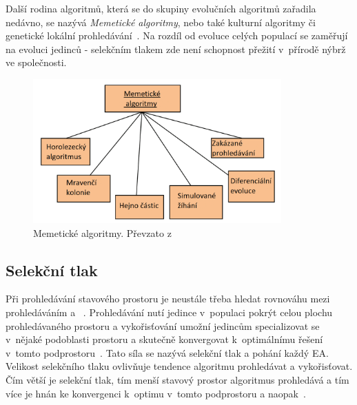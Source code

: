 Další rodina algoritmů, která se do skupiny evolučních algoritmů zařadila nedávno, se nazývá \textit{Memetické algoritmy}, nebo také kulturní algoritmy či genetické lokální prohledávání~\cite{EA_OVERVIEW}. Na rozdíl od evoluce celých populací se zaměřují na evoluci jedinců - selekčním tlakem zde není schopnost přežití v~přírodě nýbrž ve společnosti.

\begin{figure}[hbt]
	\centering
	\includegraphics[width=0.85\textwidth]{obrazky-figures/memetic.png}
	\caption{Memetické algoritmy. Převzato z~\cite{EA_OVERVIEW}}
	\label{fg:memtic}
\end{figure}

\subsection*{Selekční tlak}
Při prohledávání stavového prostoru je neustále třeba hledat rovnováhu mezi prohledáváním a ~\cite{EVO}. Prohledávání nutí jedince v~populaci pokrýt celou plochu prohledávaného prostoru a vykořisťování umožní jedincům specializovat se v~nějaké podoblasti prostoru a skutečně konvergovat k~optimálnímu řešení v~tomto podprostoru~\cite{Weisser2010}. Tato síla se nazývá selekční tlak a pohání každý EA. Velikost selekčního tlaku ovlivňuje tendence algoritmu prohledávat a vykořisťovat. Čím větší je selekční tlak, tím menší stavový prostor algoritmus prohledává a tím více je hnán ke konvergenci k~optimu v~tomto podprostoru a naopak~\cite{Weisser2010}.

